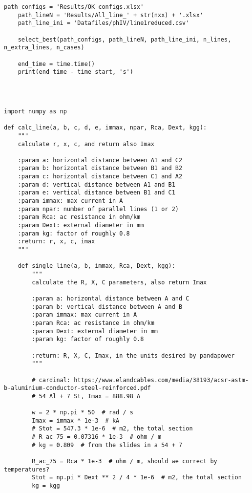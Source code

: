 \begin{lstlisting}[caption={Main code in Python with the Pandapower library}]
    path_configs = 'Results/OK_configs.xlsx'
    path_lineN = 'Results/All_line_' + str(nxx) + '.xlsx'
    path_line_ini = 'Datafiles/phIV/line1reduced.csv'

    select_best(path_configs, path_lineN, path_line_ini, n_lines, n_extra_lines, n_cases)

    end_time = time.time()
    print(end_time - time_start, 's')




\end{lstlisting}


\begin{lstlisting}[caption={Code for the calculation of lines}]
import numpy as np

def calc_line(a, b, c, d, e, immax, npar, Rca, Dext, kgg):
    """
    calculate r, x, c, and return also Imax

    :param a: horizontal distance between A1 and C2
    :param b: horizontal distance between B1 and B2
    :param c: horizontal distance between C1 and A2
    :param d: vertical distance between A1 and B1
    :param e: vertical distance between B1 and C1
    :param immax: max current in A
    :param npar: number of parallel lines (1 or 2)
    :param Rca: ac resistance in ohm/km
    :param Dext: external diameter in mm
    :param kg: factor of roughly 0.8
    :return: r, x, c, imax
    """

    def single_line(a, b, immax, Rca, Dext, kgg):
        """
        calculate the R, X, C parameters, also return Imax

        :param a: horizontal distance between A and C
        :param b: vertical distance between A and B
        :param immax: max current in A
        :param Rca: ac resistance in ohm/km
        :param Dext: external diameter in mm
        :param kg: factor of roughly 0.8

        :return: R, X, C, Imax, in the units desired by pandapower
        """

        # cardinal: https://www.elandcables.com/media/38193/acsr-astm-b-aluminium-conductor-steel-reinforced.pdf
        # 54 Al + 7 St, Imax = 888.98 A

        w = 2 * np.pi * 50  # rad / s
        Imax = immax * 1e-3  # kA
        # Stot = 547.3 * 1e-6  # m2, the total section
        # R_ac_75 = 0.07316 * 1e-3  # ohm / m
        # kg = 0.809  # from the slides in a 54 + 7

        R_ac_75 = Rca * 1e-3  # ohm / m, should we correct by temperatures?
        Stot = np.pi * Dext ** 2 / 4 * 1e-6  # m2, the total section
        kg = kgg


\end{lstlisting}
